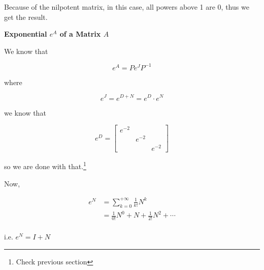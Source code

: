 Because of the nilpotent matrix, in this case, all powers above 1 are 0, thus we get the result.


\textbf{Exponential $e^A$ of a Matrix $A$}

We know that

\[e^A = P e^{J} P^{-1}\]

where

\[e^J = e^{D + N} = e^D \cdot e^N\]

we know that

\[e^D = \begin{bmatrix}
	e^{-2}&&\\&e^{-2}&\\&&e^{-2}
\end{bmatrix}\]

so we are done with that.\footnote{Check previous section}

Now,

\begin{align*}
	e^N &= \sum_{k=0}^{+\infty} \frac{1}{k!} N^k\\
	&= \frac{1}{0!} N^0 + N + \frac{1}{2!} N^2 + \cdots\\
\end{align*}

i.e. $e^N = I + N$

